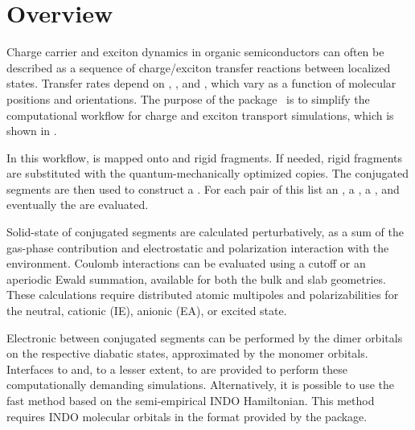 \chapter{Overview}
\label{sec:introduction}

Charge carrier and exciton dynamics in organic semiconductors can often be described as a sequence of charge/exciton transfer reactions between localized states. Transfer rates depend on , , and , which vary as a function of molecular positions and orientations. The purpose of the \votcactp package~ is to simplify the computational workflow for charge and exciton transport simulations, which is shown in . 

In this workflow,  is mapped onto   and rigid fragments. If needed, rigid fragments are substituted with the quantum-mechanically optimized copies. The conjugated segments are then used to construct a . For each pair of this list an , a , a , and eventually the  are evaluated.

Solid-state  of conjugated segments are calculated perturbatively, as a sum of the gas-phase contribution and electrostatic and polarization interaction with the environment. Coulomb interactions can be evaluated using a cutoff or an aperiodic Ewald summation, available for both the bulk and slab geometries. These calculations require distributed atomic multipoles and polarizabilities for the neutral, cationic (IE), anionic (EA), or excited state.

Electronic  between conjugated segments can be performed by  the dimer orbitals on the respective diabatic states, approximated by the monomer orbitals. Interfaces to \gaussian and, to a lesser extent, to \turbomole are provided to perform these computationally demanding simulations. Alternatively, it is possible to use the fast  method based on the semi-empirical INDO Hamiltonian. This method requires INDO molecular orbitals in the format provided by the \gaussian package.

